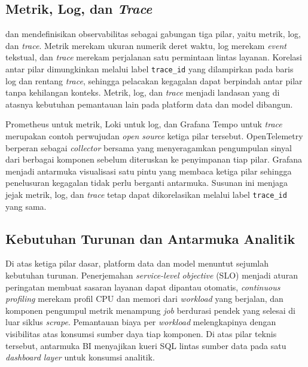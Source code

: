 \subsection{Metrik, Log, dan \textit{Trace}}
\label{subsec:pilar-observabilitas}

\textcite{cncf2024observability} dan \textcite{ibm2024observability} mendefinisikan observabilitas sebagai gabungan tiga pilar, yaitu metrik, log, dan \textit{trace}. Metrik merekam ukuran numerik deret waktu, log merekam \textit{event} tekstual, dan \textit{trace} merekam perjalanan satu permintaan lintas layanan. Korelasi antar pilar dimungkinkan melalui label \texttt{trace\_id} yang dilampirkan pada baris log dan rentang \textit{trace}, sehingga pelacakan kegagalan dapat berpindah antar pilar tanpa kehilangan konteks. Metrik, log, dan \textit{trace} menjadi landasan yang di atasnya kebutuhan pemantauan lain pada platform data dan model dibangun.

Prometheus \autocite{prometheus2024} untuk metrik, Loki \autocite{loki2024} untuk log, dan Grafana Tempo \autocite{tempo2024} untuk \textit{trace} merupakan contoh perwujudan \textit{open source} ketiga pilar tersebut. OpenTelemetry \autocite{opentelemetry2025} berperan sebagai \textit{collector} bersama yang menyeragamkan pengumpulan sinyal dari berbagai komponen sebelum diteruskan ke penyimpanan tiap pilar. Grafana \autocite{grafana2024} menjadi antarmuka visualisasi satu pintu yang membaca ketiga pilar sehingga penelusuran kegagalan tidak perlu berganti antarmuka. Susunan ini menjaga jejak metrik, log, dan \textit{trace} tetap dapat dikorelasikan melalui label \texttt{trace\_id} yang sama.

\subsection{Kebutuhan Turunan dan Antarmuka Analitik}
\label{subsec:kebutuhan-observabilitas}

Di atas ketiga pilar dasar, platform data dan model menuntut sejumlah kebutuhan turunan. Penerjemahan \textit{service-level objective} (SLO) menjadi aturan peringatan membuat sasaran layanan dapat dipantau otomatis, \textit{continuous profiling} merekam profil CPU dan memori dari \textit{workload} yang berjalan, dan komponen pengumpul metrik menampung \textit{job} berdurasi pendek yang selesai di luar siklus \textit{scrape}. Pemantauan biaya per \textit{workload} melengkapinya dengan visibilitas atas konsumsi sumber daya tiap komponen. Di atas pilar teknis tersebut, antarmuka BI menyajikan kueri SQL lintas sumber data pada satu \textit{dashboard layer} untuk konsumsi analitik.

